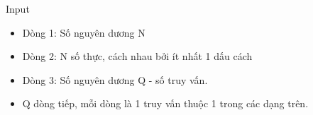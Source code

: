 Input
\begin{itemize}
	\item     Dòng 1: Số nguyên dương N   
	\item     Dòng 2: N số thực, cách nhau bởi ít nhất 1 dấu cách   
	\item     Dòng 3: Số nguyên dương Q - số truy vấn.   
	\item     Q dòng tiếp, mỗi dòng là 1 truy vấn thuộc 1 trong các dạng trên.   
\end{itemize}